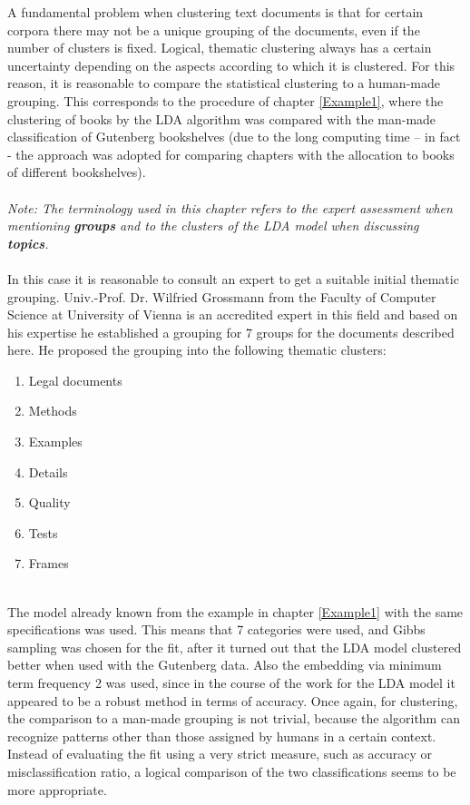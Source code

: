 \documentclass[11pt,a4paper]{article}
\begin{document}
A fundamental problem when clustering text documents is that for certain corpora there may not be a unique grouping of the documents, even if the number of clusters is fixed. Logical, thematic clustering always has a certain uncertainty depending on the aspects according to which it is clustered. For this reason, it is reasonable to compare the statistical clustering to a human-made grouping. This corresponds to the procedure of chapter \ref{Example1}, where the clustering of books by the LDA algorithm was compared with the man-made classification of Gutenberg bookshelves (due to the long computing time – in fact - the approach was adopted for comparing chapters with the allocation to books of different bookshelves).\\
\ \\
\textit{Note: The terminology used in this chapter refers to the expert assessment when mentioning \textbf{groups} and to the clusters of the LDA model when discussing \textbf{topics}.}\\
\ \\
In this case it is reasonable to consult an expert to get a suitable initial thematic grouping. Univ.-Prof. Dr. Wilfried Grossmann from the Faculty of Computer Science at University of Vienna is an accredited expert in this field and based on his expertise he established a grouping for 7 groups for the documents described here. He proposed the grouping into the following thematic clusters: 
\begin{enumerate}
	\item Legal documents
	\item Methods
	\item Examples
	\item Details
	\item Quality
	\item Tests
	\item Frames
\end{enumerate}
\ \\
The model already known from the example in chapter \ref{Example1} with the same specifications was used. This means that 7 categories were used, and Gibbs sampling was chosen for the fit, after it turned out that the LDA model clustered better when used with the Gutenberg data. Also the embedding via minimum term frequency 2 was used, since in the course of the work for the LDA model it appeared to be a robust method in terms of accuracy. Once again, for clustering, the comparison to a man-made grouping is not trivial, because the algorithm can recognize patterns other than those assigned by humans in a certain context. Instead of evaluating the fit using a very strict measure, such as accuracy or misclassification ratio, a logical comparison of the two classifications seems to be more appropriate.\\
\end{document}
